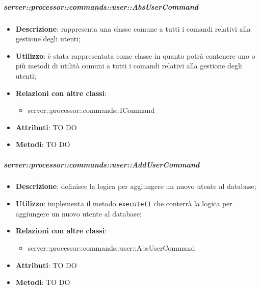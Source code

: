         \subparagraph{server::processor::commands::user::AbsUserCommand} %
        \label{subp:bdsm_app_server_processor_commands_user_absusercommand}
        \begin{itemize}
          \item \textbf{Descrizione}: rappresenta una classe comune a tutti i comandi relativi alla gestione degli utenti;
          \item \textbf{Utilizzo}: è stata rappresentata come classe in quanto potrà contenere uno o più metodi di utilità comuni a tutti i comandi relativi alla gestione degli utenti;
          \item \textbf{Relazioni con altre classi}:
            \begin{itemize}
              \item server::processor::commands::ICommand
            \end{itemize}
			\item \textbf{Attributi}: TO DO
			\item \textbf{Metodi}: TO DO
        \end{itemize}

        \subparagraph{server::processor::commands::user::AddUserCommand} %
        \label{subp:bdsm_app_server_processor_commands_user_addusercommand}
        \begin{itemize}
          \item \textbf{Descrizione}: definisce la logica per aggiungere un nuovo utente al database;
          \item \textbf{Utilizzo}: implementa il metodo \texttt{execute()} che conterrà la logica per aggiungere un nuovo utente al database;
          \item \textbf{Relazioni con altre classi}:
            \begin{itemize}
              \item server::processor::commands::user::AbsUserCommand
            \end{itemize}
			\item \textbf{Attributi}: TO DO
			\item \textbf{Metodi}: TO DO
        \end{itemize}

